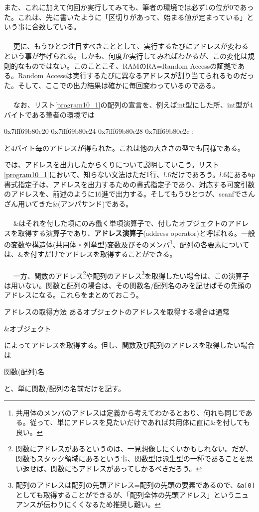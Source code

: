 また、これに加えて何回か実行してみても、筆者の環境では必ず1の位が0であった。これは、先に書いたように「区切りがあって、始まる値が定まっている」という事に合致している。
\\ \\　
更に、もうひとつ注目すべきこととして、実行するたびにアドレスが変わるという事が挙げられる。しかも、何度か実行してみればわかるが、この変化は規則的なものではない。このことこそ、RAMのRA=Random Accessの証拠である。Random Accessは実行するたびに異なるアドレスが割り当てられるものだった。そして、ここでの出力結果は確かに毎回変わっているのである。
\\ \\　
なお、リスト\ref{program10_1}の配列の宣言を、例えばint型にした所、int型が4バイトである筆者の環境では
\begin{code}
0x7fff69b80c20
0x7fff69b80c24
0x7fff69b80c28
0x7fff69b80c2c
    :
\end{code}
と4バイト毎のアドレスが得られた。これは他の大きさの型でも同様である。

では、アドレスを出力したからくりについて説明していこう。リスト\ref{program10_1}において、知らない文法はただ1行、$l$.6だけであろう。$l$.6にある\verb|%p|書式指定子は、アドレスを出力するための書式指定子であり、対応する可変引数のアドレスを、前述のように16進で出力する。そしてもうひとつが、scanfでさんざん用いてきた\&(アンパサンド)である。
\\ \\　
\&はそれを付した項にのみ働く単項演算子で、付したオブジェクトのアドレスを取得する演算子であり、\textbf{アドレス演算子}(address operator)と呼ばれる。一般の変数や構造体(共用体・列挙型)変数及びそのメンバ\footnote{共用体のメンバのアドレスは定義から考えてわかるとおり、何れも同じである。従って、単にアドレスを見たいだけであれば共用体に直に\&を付しても良い。}、配列の各要素については、\&を付すだけでアドレスを取得することができる。
\\ \\　
一方、関数のアドレス\footnote{関数にアドレスがあるというのは、一見想像しにくいかもしれない。だが、関数もスタック領域にあるという事、関数型は派生型の一種であることを思い返せば、関数にもアドレスがあってしかるべきだろう。}や配列のアドレス\footnote{配列のアドレスは配列の先頭アドレス=配列の先頭の要素であるので、\verb|&a[0]|としても取得することができるが、「配列全体の先頭アドレス」というニュアンスが伝わりにくくなるため推奨し難い。}を取得したい場合は、この演算子は用いない。関数と配列の場合は、その関数名/配列名のみを記せばその先頭のアドレスになる。これらをまとめておこう。
\begin{itembox}[l]{アドレスの取得方法}
あるオブジェクトのアドレスを取得する場合は通常
\begin{code}
&オブジェクト
\end{code}
によってアドレスを取得する。但し、関数及び配列のアドレスを取得したい場合は
\begin{code}
関数(配列)名
\end{code}
と、単に関数/配列の名前だけを記す。
\end{itembox}

